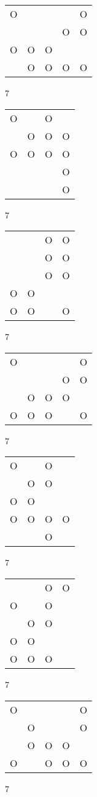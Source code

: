\begin{tabular}{|m{0.2cm}m{0.2cm}m{0.2cm}m{0.2cm}m{0.2cm}|}\hline
O& & & &O\\
 & & &O&O\\
O&O&O& & \\
 &O&O&O&O\\
\hline\end{tabular}7
\begin{tabular}{|m{0.2cm}m{0.2cm}m{0.2cm}m{0.2cm}|}\hline
O& &O& \\
 &O&O&O\\
O&O&O&O\\
 & & &O\\
 & & &O\\
\hline\end{tabular}7
\begin{tabular}{|m{0.2cm}m{0.2cm}m{0.2cm}m{0.2cm}|}\hline
 & &O&O\\
 & &O&O\\
 & &O&O\\
O&O& & \\
O&O& &O\\
\hline\end{tabular}7
\begin{tabular}{|m{0.2cm}m{0.2cm}m{0.2cm}m{0.2cm}m{0.2cm}|}\hline
O& & & &O\\
 & & &O&O\\
 &O&O&O& \\
O&O&O& &O\\
\hline\end{tabular}7
\begin{tabular}{|m{0.2cm}m{0.2cm}m{0.2cm}m{0.2cm}|}\hline
O& &O& \\
 &O&O& \\
O&O& & \\
O&O&O&O\\
 & &O& \\
\hline\end{tabular}7
\begin{tabular}{|m{0.2cm}m{0.2cm}m{0.2cm}m{0.2cm}|}\hline
 & &O&O\\
O& &O& \\
 &O&O& \\
O&O& & \\
O&O&O& \\
\hline\end{tabular}7
\begin{tabular}{|m{0.2cm}m{0.2cm}m{0.2cm}m{0.2cm}m{0.2cm}|}\hline
O& & & &O\\
 &O& & &O\\
 &O&O&O& \\
O& &O&O&O\\
\hline\end{tabular}7
